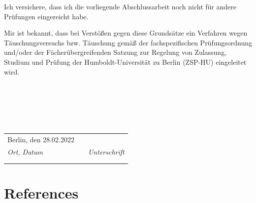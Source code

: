 \documentclass[12pt,twoside]{reedthesis}
\begin{document}
Ich versichere, dass ich die vorliegende Abschlussarbeit noch nicht für andere Prüfungen eingereicht habe.

Mir ist bekannt, dass bei Verstößen gegen diese Grundsätze ein Verfahren wegen Täuschungsversuchs bzw. Täuschung gemäß der fachspezifischen Prüfungsordnung und/oder der Fächerübergreifenden Satzung zur Regelung von Zulassung, Studium und Prüfung der Humboldt-Universität zu Berlin (ZSP-HU) eingeleitet wird.

\hfill\break
~

\hfill\break
~

\hfill\break
~
\begin{tabular}{m{6cm}m{2cm}m{6cm}}
Berlin, den 28.02.2022 &  &              \\ \cline{1-1} \cline{3-3} 
\textit{Ort, Datum}            &  & \textit{Unterschrift} \\
                       &  &              \\
                       &  &             
\end{tabular}
\backmatter

\hypertarget{references}{%
\chapter*{References}\label{references}}


\noindent

\setlength{\parindent}{-0.20in}
\end{document}
